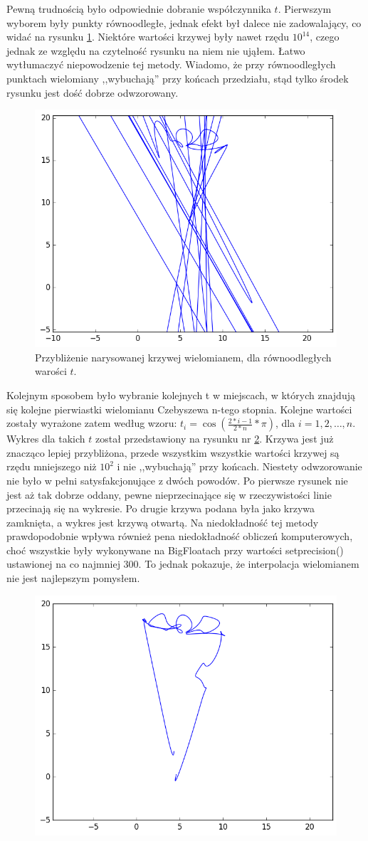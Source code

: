 \documentclass{article}
\begin{document}
Pewną trudnością było odpowiednie dobranie współczynnika $t$. Pierwszym wyborem były punkty równoodległe, jednak efekt był dalece nie zadowalający, co widać na rysunku \ref{r-w}. Niektóre wartości krzywej były nawet rzędu $10^14$, czego jednak ze względu na czytelność rysunku na niem nie ująłem. Łatwo wytłumaczyć niepowodzenie tej metody. Wiadomo, że przy równoodległych punktach wielomiany ,,wybuchają'' przy końcach przedziału, stąd tylko środek rysunku jest dość dobrze odwzorowany. 
\begin{figure}[H]
    \centering
	\includegraphics[width= 0.5 \textwidth]{rownoodlegle-wielomiany.png}
    \caption{Przybliżenie narysowanej krzywej wielomianem, dla równoodległych warości $t$.  }
 	\label{r-w}
\end{figure}
Kolejnym sposobem było wybranie kolejnych t w miejscach, w których znajdują się kolejne pierwiastki wielomianu Czebyszewa n-tego stopnia. Kolejne wartości zostały wyrażone zatem według wzoru: $ t_{i}=\cos \left({\frac  {2 * i-1}{2 * n}}* \pi \right)$, dla $i=1,2,\ldots ,n$. Wykres dla takich $t$ został przedstawiony na rysunku nr \ref{c-w}. Krzywa jest już znacząco lepiej przybliżona, przede wszystkim wszystkie wartości krzywej są rzędu mniejszego niż $10^2$ i nie ,,wybuchają'' przy końcach. Niestety odwzorowanie nie było w pełni satysfakcjonujące z dwóch powodów. Po pierwsze rysunek nie jest aż tak dobrze oddany, pewne nieprzecinające się w rzeczywistości linie przecinają się na wykresie. Po drugie krzywa podana była jako krzywa zamknięta, a wykres jest krzywą otwartą. Na niedokładność tej metody prawdopodobnie wpływa również pena niedokładność obliczeń komputerowych, choć wszystkie były wykonywane na BigFloatach przy wartości setprecision() ustawionej na co najmniej 300. To jednak pokazuje, że interpolacja wielomianem nie jest najlepszym pomysłem.
\begin{figure}[H]
    \centering
	\includegraphics[width= 0.6 \textwidth]{welomian-czebyszew.png}
    \caption{}
 	\label{c-w}
\end{figure}
\end{document}

